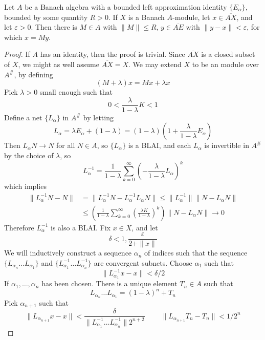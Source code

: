 \begin{theorem}
    Let $A$ be a Banach algebra with a bounded left approximation identity $\{ E_\alpha \}$, bounded by some quantity $R > 0$. If $X$ is a Banach $A$-module, let $x \in \overline{AX}$, and let $\varepsilon > 0$. Then there is $M \in A$ with $\| M \| \leq R$, $y \in \overline{AE}$ with $\| y - x \| < \varepsilon$, for which $x = My$.
\end{theorem}
\begin{proof}
    If $A$ has an identity, then the proof is trivial. Since $\overline{AX}$ is a closed subset of $X$, we might as well assume $\overline{AX} = X$. We may extend $X$ to be an module over $A^\#$, by defining
    \[ (M + \lambda) x = Mx + \lambda x \]
    Pick $\lambda > 0$ small enough such that
    \[ 0 < \frac{\lambda}{1 - \lambda} K < 1 \]
    Define a net $\{ L_\alpha \}$ in $A^\#$ by letting
    \[ L_\alpha = \lambda E_\alpha + (1 - \lambda) = (1 - \lambda) \left( 1 + \frac{\lambda}{1 - \lambda} E_\alpha \right) \]
    Then $L_\alpha N \to N$ for all $N \in A$, so $\{ L_\alpha \}$ is a BLAI, and each $L_\alpha$ is invertible in $A^\#$ by the choice of $\lambda$, so
    \[ L_\alpha^{-1} = \frac{1}{1 - \lambda} \sum_{k = 0}^\infty \left(- \frac{\lambda}{1 - \lambda} L_\alpha \right)^k \]
    which implies
    \begin{align*}
        \| L_\alpha^{-1} N - N \| &= \| L_\alpha^{-1} N - L_\alpha^{-1} L_\alpha N \| \leq \| L_\alpha^{-1} \| \| N - L_\alpha N \|\\
        &\leq \left( \frac{1}{1 - \lambda} \sum_{k = 0}^\infty \left( \frac{\lambda K}{1 - \lambda} \right)^k \right) \| N - L_\alpha N \| \to 0
    \end{align*}
    Therefore $L_\alpha^{-1}$ is also a BLAI. Fix $x \in X$, and let
    \[ \delta < 1, \frac{\varepsilon}{2 + \|x\|} \]
    We will inductively construct a sequence $\alpha_n$ of indices such that the sequence $\{ L_{\alpha_n} \dots L_{\alpha_1} \}$ and $\{ L_{\alpha_1}^{-1} \dots L_{\alpha_n}^{-1} \}$ are convergent subnets. Choose $\alpha_1$ such that
    \[ \| L_{\alpha_1}^{-1} x - x \| < \delta/2 \]
    If $\alpha_1, \dots, \alpha_n$ has been chosen. There is a unique element $T_n \in A$ such that
    \[  L_{\alpha_n} \dots L_{\alpha_1} = (1 - \lambda)^n + T_n \]
    Pick $\alpha_{n+1}$ such that
    \[ \| L_{\alpha_{n+1}} x - x \| < \frac{\delta}{\| L_{\alpha_1}^{-1} \dots L_{\alpha_n}^{-1} \| 2^{n+2}}\ \ \ \ \ \ \ \ \ \ \| L_{\alpha_{n+1}} T_n - T_n \| < 1/2^n \]

\end{proof}
